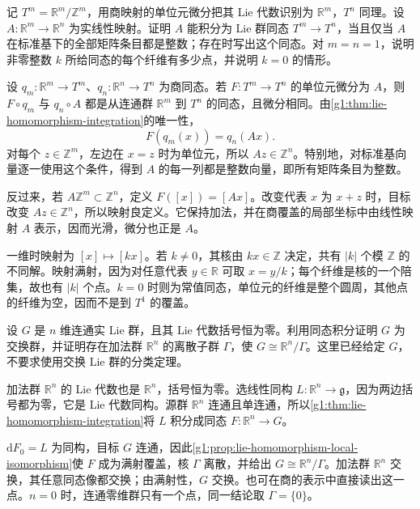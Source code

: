 \begin{exercise}\label{g1:ex:torus-homomorphism-integer-matrix}
	记 \(T^m=\mathbb R^m/\mathbb Z^m\)，用商映射的单位元微分把其 Lie 代数识别为 \(\mathbb R^m\)，\(T^n\) 同理。设 \(A:\mathbb R^m\to\mathbb R^n\) 为实线性映射。证明 \(A\) 能积分为 Lie 群同态 \(T^m\to T^n\)，当且仅当 \(A\) 在标准基下的全部矩阵条目都是整数；存在时写出这个同态。对 \(m=n=1\)，说明非零整数 \(k\) 所给同态的每个纤维有多少点，并说明 \(k=0\) 的情形。
\end{exercise}
\begin{solution}
	设 \(q_m:\mathbb R^m\to T^m\)、\(q_n:\mathbb R^n\to T^n\) 为商同态。若 \(F:T^m\to T^n\) 的单位元微分为 \(A\)，则 \(F\circ q_m\) 与 \(q_n\circ A\) 都是从连通群 \(\mathbb R^m\) 到 \(T^n\) 的同态，且微分相同。由\cref{g1:thm:lie-homomorphism-integration}的唯一性，
	\[
		F(q_m(x))=q_n(Ax).
	\]
	对每个 \(z\in\mathbb Z^m\)，左边在 \(x=z\) 时为单位元，所以 \(Az\in\mathbb Z^n\)。特别地，对标准基向量逐一使用这个条件，得到 \(A\) 的每一列都是整数向量，即所有矩阵条目为整数。

	反过来，若 \(A\mathbb Z^m\subset\mathbb Z^n\)，定义 \(F([x])=[Ax]\)。改变代表 \(x\) 为 \(x+z\) 时，目标改变 \(Az\in\mathbb Z^n\)，所以映射良定义。它保持加法，并在商覆盖的局部坐标中由线性映射 \(A\) 表示，因而光滑，微分也正是 \(A\)。

	一维时映射为 \([x]\mapsto[kx]\)。若 \(k\ne0\)，其核由 \(kx\in\mathbb Z\) 决定，共有 \(|k|\) 个模 \(\mathbb Z\) 的不同解。映射满射，因为对任意代表 \(y\in\mathbb R\) 可取 \(x=y/k\)；每个纤维是核的一个陪集，故也有 \(|k|\) 个点。\(k=0\) 时则为常值同态，单位元的纤维是整个圆周，其他点的纤维为空，因而不是到 \(T^1\) 的覆盖。
\end{solution}

\begin{exercise}\label{g1:ex:connected-abelian-lie-group-quotient}
	设 \(G\) 是 \(n\) 维连通实 Lie 群，且其 Lie 代数括号恒为零。利用同态积分证明 \(G\) 为交换群，并证明存在加法群 \(\mathbb R^n\) 的离散子群 \(\Gamma\)，使 \(G\cong\mathbb R^n/\Gamma\)。这里已经给定 \(G\)，不要求使用交换 Lie 群的分类定理。
\end{exercise}
\begin{solution}
	加法群 \(\mathbb R^n\) 的 Lie 代数也是 \(\mathbb R^n\)，括号恒为零。选线性同构 \(L:\mathbb R^n\to\mathfrak g\)，因为两边括号都为零，它是 Lie 代数同构。源群 \(\mathbb R^n\) 连通且单连通，所以\cref{g1:thm:lie-homomorphism-integration}将 \(L\) 积分成同态 \(F:\mathbb R^n\to G\)。

	\(\mathrm{d}F_0=L\) 为同构，目标 \(G\) 连通，因此\cref{g1:prop:lie-homomorphism-local-isomorphism}使 \(F\) 成为满射覆盖，核 \(\Gamma\) 离散，并给出 \(G\cong\mathbb R^n/\Gamma\)。加法群 \(\mathbb R^n\) 交换，其任意同态像都交换；由满射性，\(G\) 交换。也可在商的表示中直接读出这一点。\(n=0\) 时，连通零维群只有一个点，同一结论取 \(\Gamma=\{0\}\)。
\end{solution}

